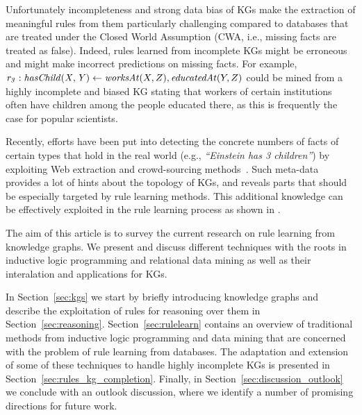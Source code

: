 Unfortunately incompleteness and strong data bias of KGs make the extraction of meaningful rules from them particularly challenging compared to databases that are treated under the Closed World Assumption (CWA, i.e., missing facts are treated as false). Indeed, rules learned from incomplete KGs might be erroneous and might make incorrect predictions on missing facts. 
For example, $\mathit{r_3}: \mathit{hasChild(X,Y)}\leftarrow \mathit{worksAt}(X,Z),\mathit{educatedAt}(Y,Z)$ could be mined from a highly incomplete and biased KG stating that workers of certain institutions often have children among the people educated there, 
as this is frequently the case for popular scientists.





Recently, efforts have been put into detecting the concrete numbers of 
facts of certain types that hold in the real world 
(e.g., \emph{``Einstein has 3 children''}) by exploiting Web extraction and crowd-sourcing methods~\cite{cardinality-extraction-iswc-2016,cool-wd}. Such 
meta-data provides a lot of hints about the topology of KGs, and reveals 
parts that should be especially targeted by rule learning methods.
This additional knowledge can be effectively exploited in the rule learning process as shown in \cite{carl}.



The aim of this article is to survey the current research on rule learning from knowledge graphs. We present and discuss different techniques with the roots in inductive logic programming and relational data mining as well as their interalation and applications for KGs. 

In Section~\ref{sec:kgs} we start by briefly introducing knowledge graphs and describe the exploitation of rules for reasoning over them in Section~\ref{sec:reasoning}. Section~\ref{sec:rulelearn} contains an overview of traditional methods from inductive logic programming and data mining that are concerned with the problem of rule learning from databases. The adaptation and extension of some of these techniques to handle highly incomplete KGs is presented in Section~\ref{sec:rules_kg_completion}. Finally, in Section~\ref{sec:discussion_outlook} we conclude with an outlook discussion, where we identify a number of promising directions for future work.

